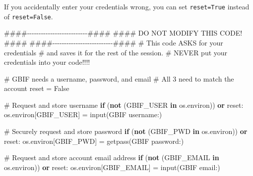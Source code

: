 \documentclass[
]{report}
\newenvironment{Shaded}{\begin{snugshade}}{\end{snugshade}}
\newcommand{\BuiltInTok}[1]{\textcolor[rgb]{0.00,0.23,0.31}{#1}}
\newcommand{\CommentTok}[1]{\textcolor[rgb]{0.37,0.37,0.37}{#1}}
\newcommand{\ControlFlowTok}[1]{\textcolor[rgb]{0.00,0.23,0.31}{\textbf{#1}}}
\newcommand{\KeywordTok}[1]{\textcolor[rgb]{0.00,0.23,0.31}{\textbf{#1}}}
\newcommand{\NormalTok}[1]{\textcolor[rgb]{0.00,0.23,0.31}{#1}}
\newcommand{\OperatorTok}[1]{\textcolor[rgb]{0.37,0.37,0.37}{#1}}
\newcommand{\StringTok}[1]{\textcolor[rgb]{0.13,0.47,0.30}{#1}}
\newcommand{\VariableTok}[1]{\textcolor[rgb]{0.07,0.07,0.07}{#1}}
\begin{document}
\begin{tcolorbox}[enhanced jigsaw, breakable, colframe=quarto-callout-tip-color-frame, toptitle=1mm, bottomrule=.15mm, colbacktitle=quarto-callout-tip-color!10!white, opacityback=0, opacitybacktitle=0.6, coltitle=black, title=\textcolor{quarto-callout-tip-color}{\faLightbulb}\hspace{0.5em}{Tip}, left=2mm, bottomtitle=1mm, titlerule=0mm, arc=.35mm, colback=white, rightrule=.15mm, toprule=.15mm, leftrule=.75mm]

If you accidentally enter your credentials wrong, you can set
\texttt{reset=True} instead of \texttt{reset=False}.

\end{tcolorbox}

\begin{Shaded}
\begin{Highlighting}[]
\CommentTok{\#\#\#\#{-}{-}{-}{-}{-}{-}{-}{-}{-}{-}{-}{-}{-}{-}{-}{-}{-}{-}{-}{-}{-}{-}{-}{-}{-}{-}\#\#\#\#}
\CommentTok{\#\#\#\# DO NOT MODIFY THIS CODE! \#\#\#\#}
\CommentTok{\#\#\#\#{-}{-}{-}{-}{-}{-}{-}{-}{-}{-}{-}{-}{-}{-}{-}{-}{-}{-}{-}{-}{-}{-}{-}{-}{-}{-}\#\#\#\#}
\CommentTok{\# This code ASKS for your credentials }
\CommentTok{\# and saves it for the rest of the session.}
\CommentTok{\# NEVER put your credentials into your code!!!!}

\CommentTok{\# GBIF needs a username, password, and email }
\CommentTok{\# All 3 need to match the account}
\NormalTok{reset }\OperatorTok{=} \VariableTok{False}

\CommentTok{\# Request and store username}
\ControlFlowTok{if}\NormalTok{ (}\KeywordTok{not}\NormalTok{ (}\StringTok{\textquotesingle{}GBIF\_USER\textquotesingle{}}  \KeywordTok{in}\NormalTok{ os.environ)) }\KeywordTok{or}\NormalTok{ reset:}
\NormalTok{    os.environ[}\StringTok{\textquotesingle{}GBIF\_USER\textquotesingle{}}\NormalTok{] }\OperatorTok{=} \BuiltInTok{input}\NormalTok{(}\StringTok{\textquotesingle{}GBIF username:\textquotesingle{}}\NormalTok{)}

\CommentTok{\# Securely request and store password}
\ControlFlowTok{if}\NormalTok{ (}\KeywordTok{not}\NormalTok{ (}\StringTok{\textquotesingle{}GBIF\_PWD\textquotesingle{}}  \KeywordTok{in}\NormalTok{ os.environ)) }\KeywordTok{or}\NormalTok{ reset:}
\NormalTok{    os.environ[}\StringTok{\textquotesingle{}GBIF\_PWD\textquotesingle{}}\NormalTok{] }\OperatorTok{=}\NormalTok{ getpass(}\StringTok{\textquotesingle{}GBIF password:\textquotesingle{}}\NormalTok{)}
    
\CommentTok{\# Request and store account email address}
\ControlFlowTok{if}\NormalTok{ (}\KeywordTok{not}\NormalTok{ (}\StringTok{\textquotesingle{}GBIF\_EMAIL\textquotesingle{}}  \KeywordTok{in}\NormalTok{ os.environ)) }\KeywordTok{or}\NormalTok{ reset:}
\NormalTok{    os.environ[}\StringTok{\textquotesingle{}GBIF\_EMAIL\textquotesingle{}}\NormalTok{] }\OperatorTok{=} \BuiltInTok{input}\NormalTok{(}\StringTok{\textquotesingle{}GBIF email:\textquotesingle{}}\NormalTok{)}
\end{Highlighting}
\end{Shaded}
\end{document}
